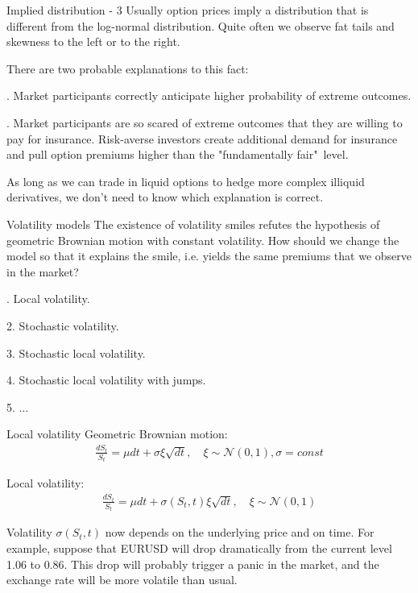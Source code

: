 \documentclass{beamer}
\begin{document}
\begin{frame}{Implied distribution - 3}
\justify
Usually option prices imply a distribution that is different from the log-normal distribution. Quite often we observe fat tails and skewness to the left or to the right.

\justify
There are two probable explanations to this fact:

. Market participants correctly anticipate higher probability of extreme outcomes.

. Market participants are so scared of extreme outcomes that they are willing to pay for insurance. Risk-averse investors create additional demand for insurance and pull option premiums higher than the "fundamentally fair"\ level.

\justify
As long as we can trade in liquid options to hedge more complex illiquid derivatives, we don't need to know which explanation is correct.
\end{frame}



\begin{frame}{Volatility models}
\justify
The existence of volatility smiles refutes the hypothesis of geometric Brownian motion with constant volatility. How should we change the model so that it explains the smile, i.e. yields the same premiums that we observe in the market?

. Local volatility.

2. Stochastic volatility.

3. Stochastic local volatility.

4. Stochastic local volatility with jumps.

5. ...
\end{frame}



\begin{frame}{Local volatility}
\justify
Geometric Brownian motion:
\begin{align*}
\frac{dS_t}{S_t} = \mu dt + \sigma\xi\sqrt{dt}, \quad \xi \sim \mathcal{N}(0, 1), \sigma = const
\end{align*}

\justify
Local volatility:
\begin{align*}
\frac{dS_t}{S_t} = \mu dt + \sigma(S_t, t)\xi\sqrt{dt}, \quad \xi \sim \mathcal{N}(0, 1)
\end{align*}

\justify
Volatility $\sigma(S_t, t)$ now depends on the underlying price and on time. For example, suppose that EURUSD will drop dramatically from the current level 1.06 to 0.86. This drop will probably trigger a panic in the market, and the exchange rate will be more volatile than usual.
\end{frame}
\end{document}
